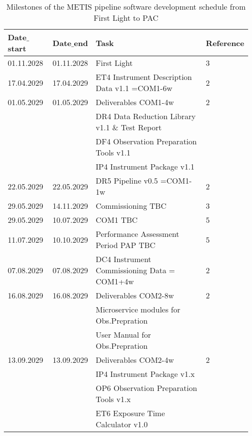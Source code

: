 \begin{table}[h!]
    \caption[Development schedule]{Milestones of the METIS pipeline software development schedule from First Light to PAC}
  \label{tab:development_schedule2}

\centering
\scriptsize
\begin{tabularx}{\textwidth}{llll}

\hline
Date$\_$start &	Date$\_$end   &	Task                            &		Reference \\
\hline\hline
01.11.2028 & 01.11.2028 & First Light 						                  &	3 \\
\hline
17.04.2029 & 17.04.2029 & ET4 Instrument Description Data v1.1 =COM1-6w		  &	2 \\
\hline
01.05.2029 & 01.05.2029 & Deliverables COM1-4w                                &	2 \\
    &          & DR4 Data Reduction Library v1.1 \& Test Report               &	\\
    &	  	   & DF4 Observation Preparation Tools v1.1                       &	\\
    &		   & IP4 Instrument Package v1.1				                  &	\\
\hline
22.05.2029 & 22.05.2029 & DR5 Pipeline v0.5 =COM1-1w				        &	2 \\
\hline 
29.05.2029 & 14.11.2029 & Commissioning TBC					                &	3 \\
\hline
29.05.2029 & 10.07.2029 & COM1 TBC						                    &	5 \\
\hline
11.07.2029 & 10.10.2029 & Performance Assessment Period PAP TBC			    &	5 \\
\hline
07.08.2029 & 07.08.2029 & DC4 Instrument Commissioning Data = COM1+4w		&   2 \\
\hline
16.08.2029 & 16.08.2029 & Deliverables COM2-8w                              &	2 \\
    &          & Microservice modules for Obs.Prepration                    &	\\
    &		   & User Manual for Obs.Prepration				                &	\\
\hline
13.09.2029 & 13.09.2029 & Deliverables COM2-4w                              & 	2 \\
    &          & IP4 Instrument Package v1.x                                &	\\
    &	       & OP6 Observation Preparation Tools v1.x                     &	\\
    &		   & ET6 Exposure Time Calculator v1.0                          &	\\

\end{tabularx}
\end{table}
